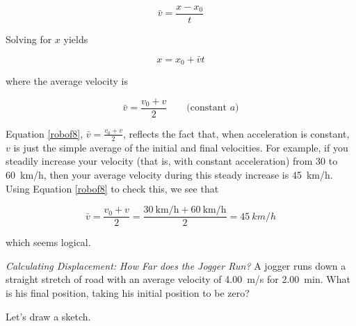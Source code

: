 \documentclass[main-ap-physics.tex]{subfiles}
\begin{document}
\begin{equation*}
    \bar{v} = \frac{x - x_0}{t}
\end{equation*}

Solving for $x$ yields 

\begin{equation} \label{FokTWv}
    x = x_0 + \bar{v}t
\end{equation}

where the average velocity is

\begin{equation}
    \bar{v} = \frac{v_0 + v}{2} \qquad \text{(constant $a$)}
\end{equation}

\cyanhrule

\vspace{1em}

Equation \eqref{robof8}, $\bar{v} = \frac{v_0 + v}{2}$, reflects the fact that, when acceleration is constant, $v$ is just the simple average of the initial and final velocities. For example, if you steadily increase your velocity (that is, with constant acceleration) from 30 to \SI{60}{km/h}, then your average velocity during this steady increase is \SI{45}{km/h}. Using Equation \eqref{robof8} to check this, we see that 

\begin{equation*}
    \bar{v} = \frac{v_0 + v}{2} = \frac{\SI[per-mode=fraction]{30}{\kilo\meter\per\hour} + \SI[per-mode=fraction]{60}{\kilo\meter\per\hour}}{2} = \SI{45}{km/h}
\end{equation*}

which seems logical.

\begin{example}
    \textit{Calculating Displacement: How Far does the Jogger Run?} A jogger runs down a straight stretch of road with an average velocity of \SI{4.00}{m/s} for \SI{2.00}{min}. What is his final position, taking his initial position to be zero?
\end{example}

\Solution Let's draw a sketch.
\end{document}
